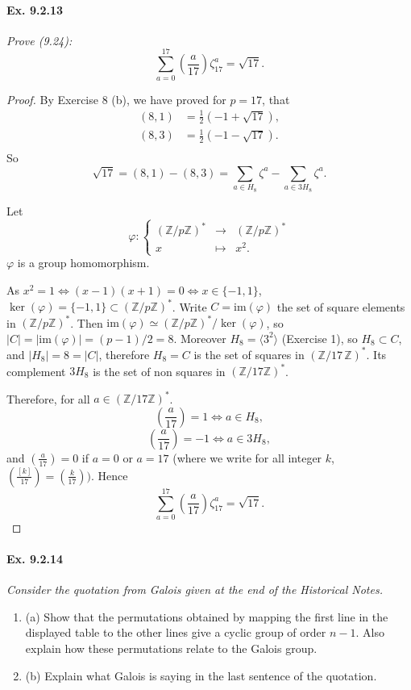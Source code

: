 \documentclass[11pt,a4paper]{article}
\newcommand{\be} {\begin{enumerate}}
\newcommand{\ee} {\end{enumerate}}
\newcommand{\Z}{\mathbb{Z}}
\newcommand{\legendre}[2]{\genfrac{(}{)}{}{}{#1}{#2}}
\begin{document}
\paragraph{Ex. 9.2.13}

{\it Prove (9.24):
$$\sum_{a=0}^{17} \legendre{a}{17} \zeta_{17}^a = \sqrt{17}.$$
}

\begin{proof}
By Exercise 8 (b), we have proved for $p=17$, that
\begin{align*}
(8,1) &= \frac{1}{2}\left(-1+\sqrt{17}\right),\\
(8,3) &= \frac{1}{2}\left(-1-\sqrt{17}\right).\\
\end{align*}
So
$$\sqrt{17} = (8,1)-(8,3) = \sum_{a \in H_8} \zeta^a - \sum_{a \in 3H_8} \zeta^a.$$

Let
$$\varphi : 
\left\{
\begin{array}{ccc}
 (\Z/p\Z)^* &  \to & (\Z/p\Z)^*  \\
 x & \mapsto  &  x^2.
\end{array}
\right.
$$
$\varphi$ is a group homomorphism.

As $x^2 = 1 \iff (x-1)(x+1) = 0 \iff x \in\{-1,1\}$, $\ker(\varphi) = \{-1,1\} \subset (\Z/p\Z)^*$. Write $C =\mathrm{im}(\varphi)$ the set of square elements in $(\Z/p\Z)^*$. Then $\mathrm{im}(\varphi) \simeq (\Z/p\Z)^*/\ker(\varphi)$, so
$|C| = |\mathrm{im}(\varphi) | = (p-1)/2 = 8$.
Moreover $H_8 = \langle 3^2 \rangle $ (Exercise 1), so $H_8 \subset C$, and $|H_8 | = 8 = |C|$, therefore $H_8 = C$ is the set of squares in $(\Z/17\, \Z)^*$.  Its complement $3H_8$ is the set of non squares in $(\Z/17\Z)^*$.

 Therefore, for all $a \in (\Z/17\Z)^*$. 
$$\legendre{a}{17} = 1 \iff a \in H_8,$$ $$ \legendre{a}{17} = -1 \iff a \in 3H_8,$$
and $\legendre{a}{17}=0$ if $a=0$ or $a=17$ (where we write for all integer $k$, $\legendre{[k]}{17} = \legendre{k}{17})$. Hence
$$\sum_{a=0}^{17} \legendre{a}{17} \zeta_{17}^a = \sqrt{17}.$$
\end{proof}

\paragraph{Ex. 9.2.14}

{\it Consider the quotation from Galois given at the end of the Historical Notes.
\be
\item[(a)] Show that the permutations obtained by mapping the first line in the displayed table to the other lines give a cyclic group of order $n-1$. Also explain how these permutations relate to the Galois group.
\item[(b)] Explain what Galois is saying in the last sentence of the quotation.
\ee
}
\end{document}
